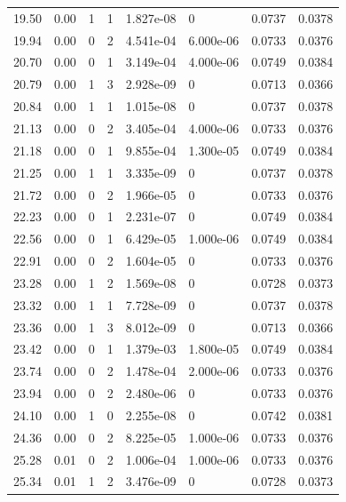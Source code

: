 \documentclass[preview]{standalone}
\begin{document}
{{{\begin{tabular}{L{1.2cm}C{1.2cm} C{0.3cm}C{0.5cm} C{1.4cm}C{1.4cm} C{1.4cm}C{1.4cm}}
  19.50  &  0.00  & 1     &  1 &  1.827e-08  & 0  & 0.0737 &  0.0378   \\ 
  19.94  &  0.00  & 0     &  2 &  4.541e-04  & 6.000e-06  & 0.0733 &  0.0376   \\ 
  20.70  &  0.00  & 0     &  1 &  3.149e-04  & 4.000e-06  & 0.0749 &  0.0384   \\ 
  20.79  &  0.00  & 1     &  3 &  2.928e-09  & 0  & 0.0713 &  0.0366   \\ 
  20.84  &  0.00  & 1     &  1 &  1.015e-08  & 0  & 0.0737 &  0.0378   \\ 
  21.13  &  0.00  & 0     &  2 &  3.405e-04  & 4.000e-06  & 0.0733 &  0.0376   \\ 
  21.18  &  0.00  & 0     &  1 &  9.855e-04  & 1.300e-05  & 0.0749 &  0.0384   \\ 
  21.25  &  0.00  & 1     &  1 &  3.335e-09  & 0  & 0.0737 &  0.0378   \\ 
  21.72  &  0.00  & 0     &  2 &  1.966e-05  & 0  & 0.0733 &  0.0376   \\ 
  22.23  &  0.00  & 0     &  1 &  2.231e-07  & 0  & 0.0749 &  0.0384   \\ 
  22.56  &  0.00  & 0     &  1 &  6.429e-05  & 1.000e-06  & 0.0749 &  0.0384   \\ 
  22.91  &  0.00  & 0     &  2 &  1.604e-05  & 0  & 0.0733 &  0.0376   \\ 
  23.28  &  0.00  & 1     &  2 &  1.569e-08  & 0  & 0.0728 &  0.0373   \\ 
  23.32  &  0.00  & 1     &  1 &  7.728e-09  & 0  & 0.0737 &  0.0378   \\ 
  23.36  &  0.00  & 1     &  3 &  8.012e-09  & 0  & 0.0713 &  0.0366   \\ 
  23.42  &  0.00  & 0     &  1 &  1.379e-03  & 1.800e-05  & 0.0749 &  0.0384   \\ 
  23.74  &  0.00  & 0     &  2 &  1.478e-04  & 2.000e-06  & 0.0733 &  0.0376   \\ 
  23.94  &  0.00  & 0     &  2 &  2.480e-06  & 0  & 0.0733 &  0.0376   \\ 
  24.10  &  0.00  & 1     &  0 &  2.255e-08  & 0  & 0.0742 &  0.0381   \\ 
  24.36  &  0.00  & 0     &  2 &  8.225e-05  & 1.000e-06  & 0.0733 &  0.0376   \\ 
  25.28  &  0.01  & 0     &  2 &  1.006e-04  & 1.000e-06  & 0.0733 &  0.0376   \\ 
  25.34  &  0.01  & 1     &  2 &  3.476e-09  & 0  & 0.0728 &  0.0373   \\ 

\end{tabular}}}}
\end{document}
